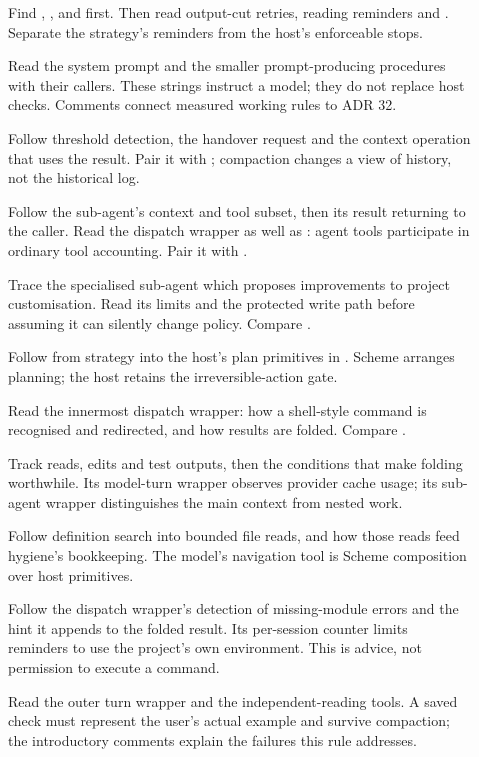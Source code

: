\begin{description}
\item[] Find ,
  ,  and  first.
  Then read output-cut retries, reading reminders and .
  Separate the strategy's reminders from the host's enforceable stops.
\item[] Read the system prompt and the
  smaller prompt-producing procedures with their callers. These strings
  instruct a model; they do not replace host checks. Comments connect
  measured working rules to ADR 32.
\item[] Follow threshold detection, the
  handover request and the context operation that uses the result. Pair it
  with ; compaction changes a view of
  history, not the historical log.
\item[] Follow the sub-agent's context and
  tool subset, then its result returning to the caller. Read the dispatch
  wrapper as well as : agent tools participate in ordinary
  tool accounting. Pair it with .
\item[] Trace the specialised sub-agent
  which proposes improvements to project customisation. Read its limits
  and the protected write path before assuming it can silently change
  policy. Compare .
\item[] Follow  from strategy
  into the host's plan primitives in . Scheme
  arranges planning; the host retains the irreversible-action gate.
\item[] Read the innermost dispatch wrapper:
  how a shell-style command is recognised and redirected, and how results
  are folded. Compare .
\item[] Track reads, edits and test outputs,
  then the conditions that make folding worthwhile. Its model-turn
  wrapper observes provider cache usage; its sub-agent wrapper distinguishes
  the main context from nested work.
\item[] Follow definition search into
  bounded file reads, and how those reads feed hygiene's bookkeeping.
  The model's navigation tool is Scheme composition over host primitives.
\item[] Follow the dispatch wrapper's
  detection of missing-module errors and the hint it appends to the folded
  result. Its per-session counter limits reminders to use the project's
  own environment. This is advice, not permission to execute a command.
\item[] Read the outer turn wrapper and
  the independent-reading tools. A saved check must represent the user's
  actual example and survive compaction; the introductory comments explain
  the failures this rule addresses.
\end{description}

